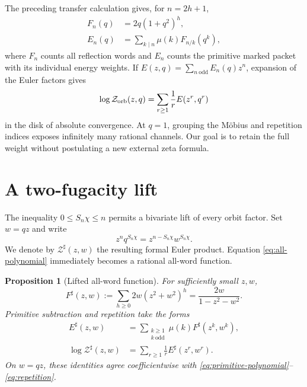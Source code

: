 \documentclass[11pt]{article}
\newtheorem{proposition}[theorem]{Proposition}
\newcommand{\Zorb}{\mathcal Z_{\rm orb}}
\newcommand{\Zsharp}{\mathcal Z^{\sharp}}
\begin{document}
The preceding transfer calculation gives, for $n=2h+1$,
\begin{align}
 F_n(q)&=2q(1+q^2)^h,\label{eq:all-polynomial}\\
 E_n(q)&=\sum_{k\mid n}\mu(k)F_{n/k}(q^k),\label{eq:primitive-polynomial}
\end{align}
where $F_n$ counts all reflection words and $E_n$ counts the primitive
marked packet with its individual energy weights.  If
$E(z,q)=\sum_{n\ \mathrm{odd}}E_n(q)z^n$, expansion of the Euler factors gives
\begin{equation}\label{eq:repetition}
 \log\Zorb(z,q)=\sum_{r\ge1}\frac1rE(z^r,q^r)
\end{equation}
in the disk of absolute convergence.  At $q=1$, grouping the M\"obius and
repetition indices exposes infinitely many rational channels.  Our goal is
to retain the full weight without postulating a new external zeta formula.

\section{A two-fugacity lift}

The inequality $0\le S_n\chi\le n$ permits a bivariate lift of every orbit
factor.  Set $w=qz$ and write
\begin{equation}\label{eq:monomial-lift}
 z^nq^{S_n\chi}=z^{n-S_n\chi}w^{S_n\chi}.
\end{equation}
We denote by $\Zsharp(z,w)$ the resulting formal Euler product.  Equation
\eqref{eq:all-polynomial} immediately becomes a rational all-word function.

\begin{proposition}[Lifted all-word function]\label{prop:all-word}
For sufficiently small $z,w$,
\begin{equation}\label{eq:Fsharp}
 F^{\sharp}(z,w)
 :=\sum_{h\ge0}2w(z^2+w^2)^h
 =\frac{2w}{1-z^2-w^2}.
\end{equation}
Primitive subtraction and repetition take the forms
\begin{align}
 E^{\sharp}(z,w)
 &=\sum_{\substack{k\ge1\\k\ \mathrm{odd}}}
   \mu(k)F^{\sharp}(z^k,w^k),\label{eq:Esharp}\\
 \log\Zsharp(z,w)
 &=\sum_{r\ge1}\frac1rE^{\sharp}(z^r,w^r).\label{eq:Zsharp-repeat}
\end{align}
On $w=qz$, these identities agree coefficientwise with
\eqref{eq:primitive-polynomial}--\eqref{eq:repetition}.
\end{proposition}
\end{document}
